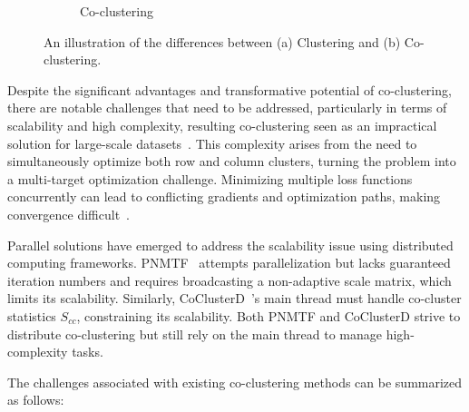 \documentclass[journal]{IEEEtran}
\renewcommand{\cite}[1]{~\autocite{#1}}
\begin{document}
\begin{figure}[htbp]
\begin{subfigure}[b]{0.22\textwidth}
    \caption{Co-clustering}
    \label{fig:cocluster}
  \end{subfigure}
  \caption{An illustration of the differences between (a) Clustering and (b) Co-clustering.}
  \label{fig:cocomparison}
\end{figure}

Despite the significant advantages and transformative potential of co-clustering, there are notable challenges that need to be addressed, particularly in terms of scalability and high complexity, resulting co-clustering seen as an impractical solution for large-scale datasets\cite{cheng2015CoClusterDDistributedFramework}.
This complexity arises from the need to simultaneously optimize both row and column clusters, turning the problem into a multi-target optimization challenge. Minimizing multiple loss functions concurrently can lead to conflicting gradients and optimization paths, making convergence difficult\cite{coello2007EvolutionaryAlgorithmsSolving}.

Parallel solutions have emerged to address the scalability issue using distributed computing frameworks. PNMTF\cite{chen2023ParallelNonNegativeMatrix} attempts parallelization but lacks guaranteed iteration numbers and requires broadcasting a non-adaptive scale matrix, which limits its scalability. Similarly, CoClusterD\cite{cheng2015CoClusterDDistributedFramework}'s main thread must handle co-cluster statistics \(S_{cc}\), constraining its scalability. Both PNMTF and CoClusterD strive to distribute co-clustering but still rely on the main thread to manage high-complexity tasks.

The challenges associated with existing co-clustering methods can be summarized as follows:
\end{document}
